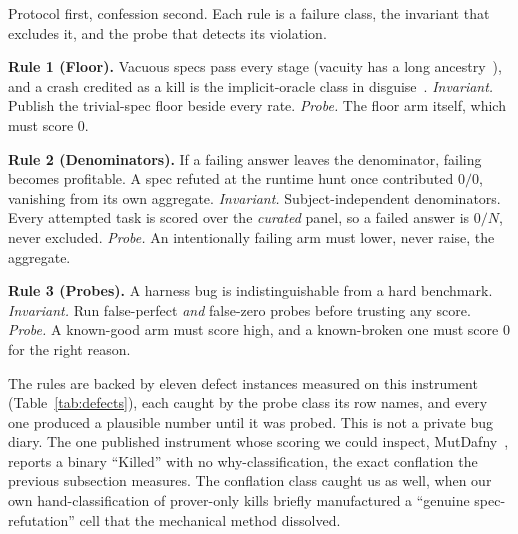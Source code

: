 \documentclass{article}
\begin{document}
Protocol first, confession second. Each rule is a failure class, the
invariant that excludes it, and the probe that detects its violation.

\textbf{Rule 1 (Floor).} Vacuous specs pass every stage (vacuity has a
long ancestry~\cite{beer,kupferman}), and a crash credited as a kill is
the implicit-oracle class in disguise~\cite{barr}. \emph{Invariant.}
Publish the trivial-spec floor beside every rate. \emph{Probe.} The floor
arm itself, which must score 0.

\textbf{Rule 2 (Denominators).} If a failing answer leaves the
denominator, failing becomes profitable. A spec refuted at the runtime
hunt once contributed $0/0$, vanishing from its own aggregate.
\emph{Invariant.} Subject-independent denominators. Every attempted task
is scored over the \emph{curated} panel, so a failed answer is $0/N$,
never excluded. \emph{Probe.} An intentionally failing arm must lower,
never raise, the aggregate.

\textbf{Rule 3 (Probes).} A harness bug is indistinguishable from a hard
benchmark. \emph{Invariant.} Run false-perfect \emph{and} false-zero
probes before trusting any score. \emph{Probe.} A known-good arm must
score high, and a known-broken one must score 0 for the right reason.

The rules are backed by eleven defect instances measured on this
instrument (Table~\ref{tab:defects}), each caught by the probe class its
row names, and every one produced a plausible number until it was probed.
This is not a private bug diary. The one published instrument whose
scoring we could inspect, MutDafny~\cite{mutdafny}, reports a binary
``Killed'' with no why-classification, the exact conflation the previous
subsection measures. The conflation class caught us as well, when our own
hand-classification of prover-only kills briefly manufactured a ``genuine
spec-refutation'' cell that the mechanical method dissolved.
\end{document}
